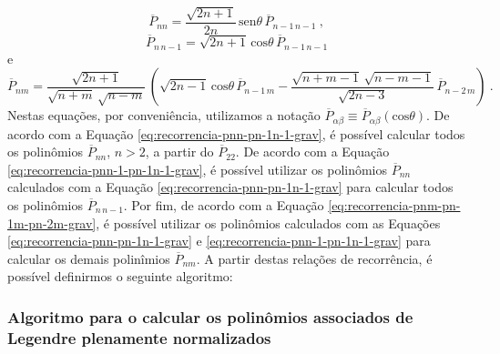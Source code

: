 \documentclass[10pt,a4paper,fleqn]{article}
\begin{document}
\begin{equation}
\overline{P}_{nn} = \frac{\sqrt{2n + 1}}{2n} \, \text{sen}\theta \, 
                    \overline{P}_{n-1 \, n-1} \: ,
\label{eq:recorrencia-pnn-pn-1n-1-grav}
\end{equation}
\begin{equation}
\overline{P}_{n \, n-1} = \sqrt{2n + 1} \, \text{cos}\theta \, 
                          \overline{P}_{n-1 \, n-1}
\label{eq:recorrencia-pnn-1-pn-1n-1-grav}
\end{equation}
e
\begin{equation}
\overline{P}_{nm} = \frac{\sqrt{2n + 1}}{\sqrt{n+m} \, \sqrt{n-m}} \,
                    \left(\sqrt{2n - 1} \, \text{cos}\theta \, \overline{P}_{n-1 \, m} -
                    \frac{\sqrt{n+m-1} \, \sqrt{n-m-1}}{\sqrt{2n-3}} \,
                    \overline{P}_{n-2 \, m} \right) \: .
\label{eq:recorrencia-pnm-pn-1m-pn-2m-grav}
\end{equation}
Nestas equa\c{c}\~{o}es, por conveni\^{e}ncia, utilizamos a nota\c{c}\~{a}o
$\overline{P}_{\alpha \beta} \equiv \overline{P}_{\alpha \beta}(\text{cos}\theta)$.
De acordo com a Equa\c{c}\~{a}o \ref{eq:recorrencia-pnn-pn-1n-1-grav}, \'{e} poss\'{i}vel
calcular todos os polin\^{o}mios $\overline{P}_{nn}$, $n > 2$, a partir do
$\overline{P}_{22}$.
De acordo com a Equa\c{c}\~{a}o \ref{eq:recorrencia-pnn-1-pn-1n-1-grav}, \'{e} poss\'{i}vel
utilizar os polin\^{o}mios $\overline{P}_{nn}$ calculados com a Equa\c{c}\~{a}o
\ref{eq:recorrencia-pnn-pn-1n-1-grav} para calcular todos os polin\^{o}mios 
$\overline{P}_{n \, n-1}$.
Por fim, de acordo com a Equa\c{c}\~{a}o \ref{eq:recorrencia-pnm-pn-1m-pn-2m-grav},
\'{e} poss\'{i}vel utilizar os polin\^{o}mios calculados com as Equa\c{c}\~{o}es
\ref{eq:recorrencia-pnn-pn-1n-1-grav} e \ref{eq:recorrencia-pnn-1-pn-1n-1-grav}
para calcular os demais polin\^{i}mios $\overline{P}_{nm}$.
A partir destas rela\c{c}\~{o}es de recorr\^{e}ncia, \'{e} poss\'{i}vel definirmos
o seguinte algoritmo:

\subsubsection{Algoritmo para o calcular os polin\^{o}mios associados de Legendre 
plenamente normalizados}

\bigskip
\end{document}

